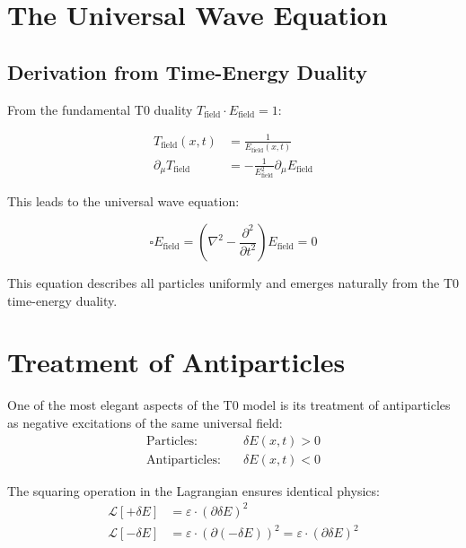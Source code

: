 \documentclass[12pt,a4paper]{report}
\begin{document}
	\section{The Universal Wave Equation}
	
	\subsection{Derivation from Time-Energy Duality}
	\label{subsec:derivation_wave_equation}
	
	From the fundamental T0 duality $T_{\text{field}} \cdot E_{\text{field}} = 1$:
	
	\begin{align}
		T_{\text{field}}(x,t) &= \frac{1}{E_{\text{field}}(x,t)} \\
		\partial_\mu T_{\text{field}} &= -\frac{1}{E_{\text{field}}^2} \partial_\mu E_{\text{field}}
	\end{align}
	
	This leads to the universal wave equation:
	
	\begin{equation}
		\square E_{\text{field}} = \left(\nabla^2 - \frac{\partial^2}{\partial t^2}\right) E_{\text{field}} = 0
		\label{eq:universal_wave_equation}
	\end{equation}
	
	This equation describes all particles uniformly and emerges naturally from the T0 time-energy duality.
	
	\section{Treatment of Antiparticles}
	
	One of the most elegant aspects of the T0 model is its treatment of antiparticles as negative excitations of the same universal field:
	\begin{align}
		\text{Particles:} \quad &\delta E(x,t) > 0 \\
		\text{Antiparticles:} \quad &\delta E(x,t) < 0
	\end{align}
	
	The squaring operation in the Lagrangian ensures identical physics:
	\begin{align}
		\mathcal{L}[+\delta E] &= \varepsilon \cdot (\partial \delta E)^2 \\
		\mathcal{L}[-\delta E] &= \varepsilon \cdot (\partial(-\delta E))^2 = \varepsilon \cdot (\partial \delta E)^2
	\end{align}
	
\end{document}
